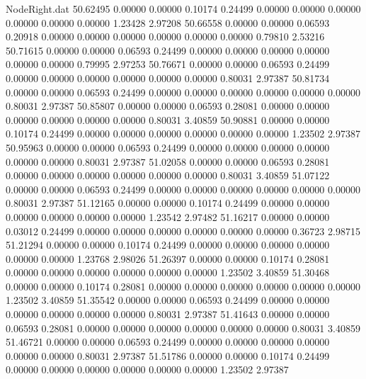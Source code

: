 \begin{filecontents}{NodeRight.dat}
  50.62495    0.00000    0.00000     0.10174    0.24499    0.00000    0.00000    0.00000    0.00000    0.00000    0.00000    1.23428    2.97208
  50.66558    0.00000    0.00000     0.06593    0.20918    0.00000    0.00000    0.00000    0.00000    0.00000    0.00000    0.79810    2.53216
  50.71615    0.00000    0.00000     0.06593    0.24499    0.00000    0.00000    0.00000    0.00000    0.00000    0.00000    0.79995    2.97253
  50.76671    0.00000    0.00000     0.06593    0.24499    0.00000    0.00000    0.00000    0.00000    0.00000    0.00000    0.80031    2.97387
  50.81734    0.00000    0.00000     0.06593    0.24499    0.00000    0.00000    0.00000    0.00000    0.00000    0.00000    0.80031    2.97387
  50.85807    0.00000    0.00000     0.06593    0.28081    0.00000    0.00000    0.00000    0.00000    0.00000    0.00000    0.80031    3.40859
  50.90881    0.00000    0.00000     0.10174    0.24499    0.00000    0.00000    0.00000    0.00000    0.00000    0.00000    1.23502    2.97387
  50.95963    0.00000    0.00000     0.06593    0.24499    0.00000    0.00000    0.00000    0.00000    0.00000    0.00000    0.80031    2.97387
  51.02058    0.00000    0.00000     0.06593    0.28081    0.00000    0.00000    0.00000    0.00000    0.00000    0.00000    0.80031    3.40859
  51.07122    0.00000    0.00000     0.06593    0.24499    0.00000    0.00000    0.00000    0.00000    0.00000    0.00000    0.80031    2.97387
  51.12165    0.00000    0.00000     0.10174    0.24499    0.00000    0.00000    0.00000    0.00000    0.00000    0.00000    1.23542    2.97482
  51.16217    0.00000    0.00000     0.03012    0.24499    0.00000    0.00000    0.00000    0.00000    0.00000    0.00000    0.36723    2.98715
  51.21294    0.00000    0.00000     0.10174    0.24499    0.00000    0.00000    0.00000    0.00000    0.00000    0.00000    1.23768    2.98026
  51.26397    0.00000    0.00000     0.10174    0.28081    0.00000    0.00000    0.00000    0.00000    0.00000    0.00000    1.23502    3.40859
  51.30468    0.00000    0.00000     0.10174    0.28081    0.00000    0.00000    0.00000    0.00000    0.00000    0.00000    1.23502    3.40859
  51.35542    0.00000    0.00000     0.06593    0.24499    0.00000    0.00000    0.00000    0.00000    0.00000    0.00000    0.80031    2.97387
  51.41643    0.00000    0.00000     0.06593    0.28081    0.00000    0.00000    0.00000    0.00000    0.00000    0.00000    0.80031    3.40859
  51.46721    0.00000    0.00000     0.06593    0.24499    0.00000    0.00000    0.00000    0.00000    0.00000    0.00000    0.80031    2.97387
  51.51786    0.00000    0.00000     0.10174    0.24499    0.00000    0.00000    0.00000    0.00000    0.00000    0.00000    1.23502    2.97387

\end{filecontents}
